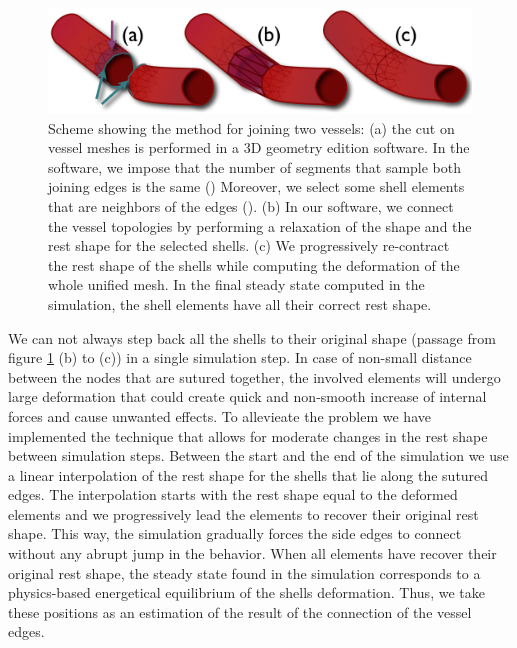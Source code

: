 \begin{figure}[tbh]
\begin{center}
\includegraphics[width=\columnwidth]{img/rest_shape_scheme.png}
\end{center}

\caption{Scheme showing the method for joining two vessels:  (a) the cut on vessel meshes is performed in a 3D geometry edition software. In the software, we impose that the number of segments that sample both joining edges is the same (\color{BlueGreen}{$\mathbf{\rightarrow}$}\color{black})
Moreover, we select some shell elements that are neighbors of the edges (\color{purple}{$\mathbf{\rightarrow}$}\color{black}).
(b) In our software, we connect the vessel topologies by performing a relaxation of the shape and the rest shape for the selected shells.  
(c) We progressively re-contract the rest shape of the shells while computing the deformation of the whole unified mesh. 
In the final steady state computed in the simulation, the shell elements have all their correct rest shape.}
\label{fig-JoiningVessels}
\end{figure}

We can not always step back all the shells to their original shape (passage from figure \ref{fig-JoiningVessels} (b) to (c))  in a single simulation step. 
In case of non-small distance between the nodes that are sutured together, the involved elements will undergo large deformation that could create quick and non-smooth increase of internal forces and  cause unwanted effects.
To allevieate the problem we have implemented the technique that allows for moderate changes in the rest shape between simulation steps.
Between the start and the end of the simulation we use a linear interpolation of the rest shape for the shells that lie along the sutured edges. 
The interpolation starts with the rest shape equal to the deformed elements and we progressively lead the elements to recover their original rest shape.
This way, the simulation gradually forces the side edges to connect without any abrupt jump in the behavior.
When all elements have recover their original rest shape, the steady state found in the simulation corresponds to a physics-based energetical equilibrium of the shells deformation. 
Thus, we take these positions as an estimation of the result of the connection of the vessel edges.

